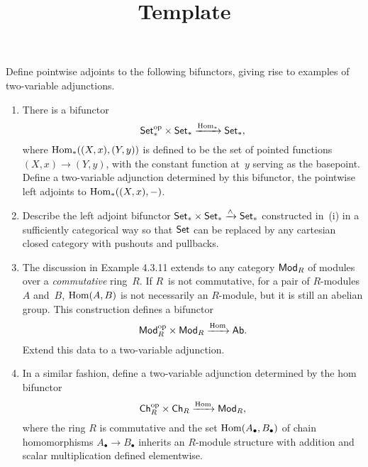 \documentclass[../../solutions]{subfiles}
\title{Template}
\author{}
\begin{document}
\maketitle

%

\begin{exercise}
  Define pointwise adjoints to the following bifunctors, giving rise
  to examples of two-variable adjunctions.
  \begin{enumerate}[label=(\roman*)]
  \item There is a bifunctor
    $$\mathsf{Set}_*^{\mathrm{op}}\times\mathsf{Set}_*\xrightarrow{\operatorname{Hom}_*}\mathsf{Set}_*,$$
    where $\operatorname{Hom}_*((X,x),(Y,y))$ is defined to be the set of pointed
    functions $(X,x)\to(Y,y)$, with the constant function at~$y$
    serving as the basepoint.  Define a two-variable adjunction
    determined by this bifunctor, the pointwise left adjoints to
    $\operatorname{Hom}_*((X,x),-)$.
  \item Describe the left adjoint bifunctor
    $\mathsf{Set}_*\times\mathsf{Set}_*\xrightarrow{\wedge}\mathsf{Set}_*$ constructed in~(i) in
    a sufficiently categorical way so that $\mathsf{Set}$ can be replaced by
    any cartesian closed category with pushouts and pullbacks.
  \item The discussion in Example 4.3.11 extends to any category
    $\mathsf{Mod}_{R}$ of modules over a \emph{commutative} ring~$R$.  If
    $R$~is not commutative, for a pair of $R$-modules $A$ and~$B$,
    $\operatorname{Hom}(A,B)$ is not necessarily an $R$-module, but it is still an
    abelian group.  This construction defines a bifunctor
    $$\mathsf{Mod}_{R}^{\mathrm{op}}\times\mathsf{Mod}_{R}\xrightarrow{\operatorname{Hom}}\mathsf{Ab}.$$
    Extend this data to a two-variable adjunction.
  \item In a similar fashion, define a two-variable adjunction
    determined by the hom bifunctor
    $$\mathsf{Ch}_R^{\mathrm{op}}\times\mathsf{Ch}_R\xrightarrow{\operatorname{Hom}}\mathsf{Mod}_{R},$$
    where the ring $R$ is commutative and the set
    $\operatorname{Hom}(A_\bullet,B_\bullet)$ of chain homomorphisms $A_\bullet\to
    B_\bullet$ inherits an $R$-module structure with addition and
    scalar multiplication defined elementwise.
  \end{enumerate}
\end{exercise}
\end{document}
